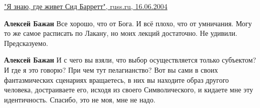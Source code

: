 \begin{itemize}
\href{russ.ru/pole/YA-znayu-gde-zhivet-Sid-Barrett}{%
"Я знаю, где живет Сид Барретт", russ.ru, 16.06.2004%
}

\begin{itemize}
 
\textbf{Алексей Бажан} Все хорошо, что от Бога. И всё плохо, что от умничания.
Могу то же самое расписать по Лакану, но моих лекций достаточно. Не удивили.
Предсказуемо.

 
\textbf{Алексей Бажан} И с чего вы взяли, что выбор осуществляется только
субъектом? И где я это говорю? При чем тут пелагианство? Вот вы сами в своих
фантазмических сценариях вращаетесь, в них вы находите образ другого человека,
достраиваете его, исходя из своего Символического, и кидаете мне эту
идентичность. Спасибо, это не моя, мне не надо.
\end{itemize}

\end{itemize}

